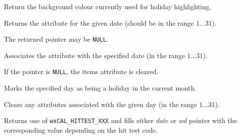 
Return the background colour currently used for holiday highlighting.




\label{wxcalendarctrlgetattr}


Returns the attribute for the given date (should be in the range $1\ldots31$).

The returned pointer may be {\tt NULL}.


\label{wxcalendarctrlsetattr}


Associates the attribute with the specified date (in the range $1\ldots31$).

If the pointer is {\tt NULL}, the items attribute is cleared.


\label{wxcalendarctrlsetholiday}


Marks the specified day as being a holiday in the current month.


\label{wxcalendarctrlresetattr}


Clears any attributes associated with the given day (in the range
$1\ldots31$).


\label{wxcalendarctrlhittest}


Returns one of {\tt wxCAL\_HITTEST\_XXX} 
 and fills either {\it date} or 
{\it wd} pointer with the corresponding value depending on the hit test code.

\section{}\label{wxcalendardateattr}

